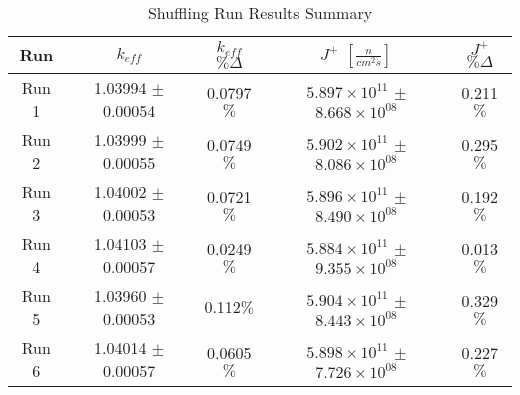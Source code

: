 

\begin{table}[H]
\centering
\caption{Shuffling Run Results Summary}
 \begin{tabularx}{0.7\textwidth}{c  c  c  c  c}
 	\hline
 	Run & $k_{eff}$ & $k_{eff}$ $\% \Delta$ & $J^+$  $[\frac{n}{cm^2s}]$ & $J^+$ $\% \Delta$ \\
 	\hline
 	Run 1 & 1.03994 $\pm$ 0.00054 & 0.0797$\%$ & $5.897\times10^{11}$ $\pm$ $8.668\times10^{08}$ & 0.211$\%$ \\
 	Run 2 & 1.03999 $\pm$ 0.00055 & 0.0749$\%$ & $5.902\times10^{11}$ $\pm$ $8.086\times10^{08}$  & 0.295$\%$ \\
 	Run 3 & 1.04002 $\pm$ 0.00053 & 0.0721$\%$ & $5.896\times10^{11}$ $\pm$ $8.490\times10^{08}$ & 0.192$\%$  \\
 	Run 4 & 1.04103 $\pm$ 0.00057 & 0.0249$\%$ & $5.884\times10^{11}$ $\pm$ $9.355\times10^{08}$ & 0.013$\%$ \\
 	Run 5 & 1.03960 $\pm$ 0.00053 & 0.112$\%$ & $5.904\times10^{11}$ $\pm$ $8.443\times10^{08}$ & 0.329$\%$  \\
 	Run 6 & 1.04014 $\pm$ 0.00057 & 0.0605$\%$ & $5.898\times10^{11}$ $\pm$ $7.726\times10^{08}$ & 0.227$\%$ \\
 	\hline

 \end{tabularx}
\label{table:shufsens}
\end{table}